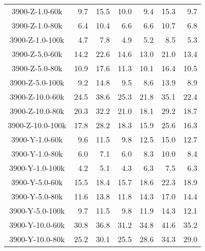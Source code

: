 \begin{longtable}{crrrrrr}
      3900-Z-1.0-60k &         9.7 &        15.5 &        10.0 &            9.4 &           15.3 &            9.7 \\
      3900-Z-1.0-80k &         6.4 &        10.4 &         6.6 &            6.6 &           10.7 &            6.8 \\
      3900-Z-1.0-100k &         4.7 &         7.8 &         4.9 &            5.2 &            8.5 &            5.3 \\
      3900-Z-5.0-60k &        14.2 &        22.6 &        14.6 &           13.0 &           21.0 &           13.4 \\
      3900-Z-5.0-80k &        10.9 &        17.6 &        11.3 &           10.1 &           16.4 &           10.5 \\
      3900-Z-5.0-100k &         9.2 &        14.8 &         9.5 &            8.6 &           13.9 &            8.9 \\
      3900-Z-10.0-60k &        24.5 &        38.6 &        25.3 &           21.8 &           35.1 &           22.4 \\
      3900-Z-10.0-80k &        20.3 &        32.2 &        21.0 &           18.1 &           29.2 &           18.7 \\
      3900-Z-10.0-100k &        17.8 &        28.2 &        18.3 &           15.9 &           25.6 &           16.3 \\
      3900-Y-1.0-60k &         9.6 &        11.5 &         9.8 &           12.5 &           15.0 &           12.7 \\
      3900-Y-1.0-80k &         6.0 &         7.1 &         6.0 &            8.3 &           10.0 &            8.4 \\
      3900-Y-1.0-100k &         4.2 &         5.1 &         4.3 &            6.3 &            7.5 &            6.3 \\
      3900-Y-5.0-60k &        15.5 &        18.4 &        15.7 &           18.6 &           22.3 &           18.9 \\
      3900-Y-5.0-80k &        11.6 &        13.8 &        11.8 &           14.3 &           17.0 &           14.4 \\
      3900-Y-5.0-100k &         9.7 &        11.5 &         9.8 &           11.9 &           14.3 &           12.1 \\
      3900-Y-10.0-60k &        30.8 &        36.8 &        31.2 &           34.8 &           41.6 &           35.2 \\
      3900-Y-10.0-80k &        25.2 &        30.1 &        25.5 &           28.6 &           34.3 &           29.0 \\

\end{longtable}
